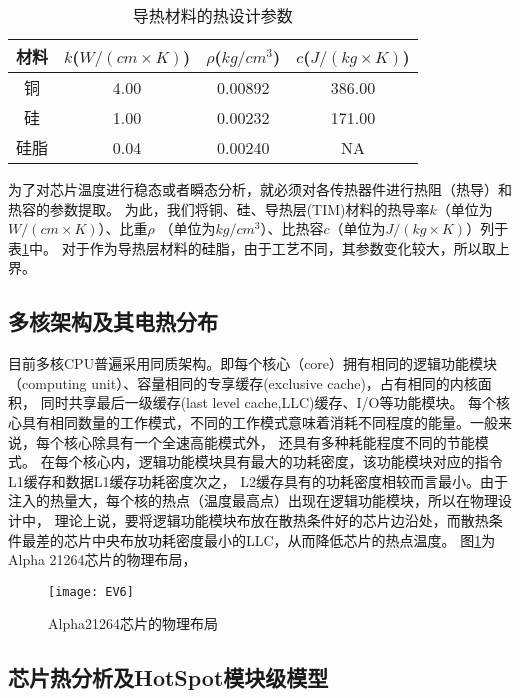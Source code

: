 \begin{table}
\centering
\caption{导热材料的热设计参数}
\begin{tabular}{c c c c}
\hline\hline
材料 & $k$($W/(cm \times K)$) & $\rho$($kg/cm^3$) & $c$($J/(kg \times K)$) \\ [0.5ex]
\hline
铜 & 4.00 & 0.00892 & 386.00  \\
硅 & 1.00 & 0.00232 & 171.00 \\
硅脂 & 0.04 & 0.00240 & NA \\
\hline
\end{tabular}
\label{tab:chap4:cu-si-material}
\end{table}

为了对芯片温度进行稳态或者瞬态分析，就必须对各传热器件进行热阻（热导）和热容的参数提取。 为此，我们将铜、硅、导热层(TIM)材料的热导率$k$（单位为$W/(cm \times K)$）、比重$\rho$ （单位为$kg/cm^3$）、比热容$c$（单位为$J/(kg \times K)$）列于表\ref{tab:chap4:cu-si-material}中。 对于作为导热层材料的硅脂，由于工艺不同，其参数变化较大，所以取上界。


\subsection{多核架构及其电热分布}

目前多核CPU普遍采用同质架构。即每个核心（core）拥有相同的逻辑功能模块（computing unit）、容量相同的专享缓存(exclusive cache)，占有相同的内核面积， 同时共享最后一级缓存(last level cache,LLC)缓存、I/O等功能模块。 每个核心具有相同数量的工作模式，不同的工作模式意味着消耗不同程度的能量。一般来说，每个核心除具有一个全速高能模式外， 还具有多种耗能程度不同的节能模式。
在每个核心内，逻辑功能模块具有最大的功耗密度，该功能模块对应的指令L1缓存和数据L1缓存功耗密度次之， L2缓存具有的功耗密度相较而言最小。由于注入的热量大，每个核的热点（温度最高点）出现在逻辑功能模块，所以在物理设计中， 理论上说，要将逻辑功能模块布放在散热条件好的芯片边沿处，而散热条件最差的芯片中央布放功耗密度最小的LLC，从而降低芯片的热点温度。 图\ref{fig:ev6}为Alpha 21264芯片的物理布局，

\begin{figure}[H]
  \centering
  \texttt{[image: EV6]}
  \caption{Alpha21264芯片的物理布局}
  \label{fig:ev6}
\end{figure}


\subsection{芯片热分析及HotSpot模块级模型}

